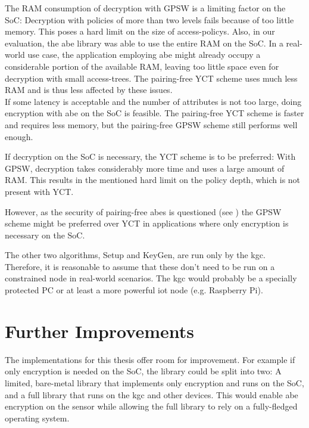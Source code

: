 The RAM consumption of decryption with GPSW is a limiting factor on the SoC:
Decryption with policies of more than two levels fails because of too little memory.
This poses a hard limit on the size of \glspl{access-policy}.
Also, in our evaluation, the \acrshort{abe} library was able to use  the entire RAM on the SoC.
In a real-world use case, the application employing \acrshort{abe} might already occupy a considerable portion of the available RAM, leaving too little space even for decryption with small \glspl{access-tree}.
The pairing-free YCT scheme uses much less RAM and is thus less affected by these issues. %
\\

If some latency is acceptable and the number of attributes is not too large, doing encryption with \acrshort{abe} on the SoC is feasible.
The pairing-free YCT scheme is faster and requires less memory, but the pairing-free GPSW scheme still performs well enough.

If decryption on the SoC is necessary, the YCT scheme is to be preferred:
With GPSW, decryption takes considerably more time and uses a large amount of RAM.
This results in the mentioned hard limit on the policy depth, which is not present with YCT.

However, as the security of pairing-free \acrshort{abes} is questioned (see \cite{herranz_attacking_2020}) the GPSW scheme might be preferred over YCT in applications where only encryption is necessary on the SoC. %

The other two algorithms, Setup and KeyGen, are run only by the \acrshort{kgc}.
Therefore, it is reasonable to assume that these don't need to be run on a constrained node in real-world scenarios.
The \acrshort{kgc} would probably be a specially protected PC or at least a more powerful \acrshort{iot} node (e.g. Raspberry Pi).

\section{Further Improvements}

The implementations for this thesis offer room for improvement.
For example if only encryption is needed on the SoC, the library could be split into two:
A limited, bare-metal library that implements only encryption and runs on the SoC, and a full library that runs on the \acrshort{kgc} and other devices.
This would enable \acrshort{abe} encryption on the sensor while allowing the full library to rely on a fully-fledged operating system.

